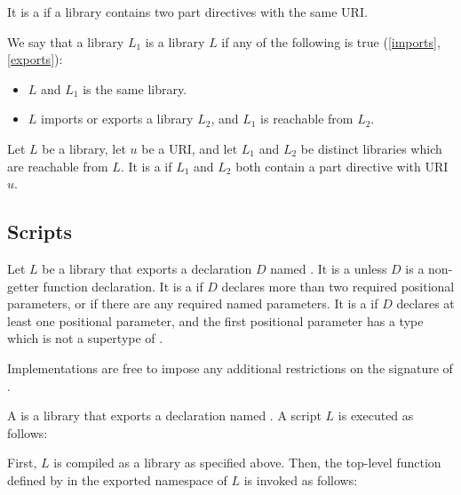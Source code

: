 \documentclass[makeidx]{article}
\begin{document}
\LMHash{}%
It is a  if a library contains
two part directives with the same URI.

\LMHash{}%
We say that a library $L_1$ is  a library $L$ if
any of the following is true (\ref{imports}, \ref{exports}):
\begin{itemize}
\item $L$ and $L_1$ is the same library.
\item $L$ imports or exports a library $L_2$, and $L_1$ is reachable from $L_2$.
\end{itemize}

\LMHash{}%
Let $L$ be a library, let $u$ be a URI,
and let $L_1$ and $L_2$ be distinct libraries which are reachable from $L$.
It is a  if $L_1$ and $L_2$ both contain
a part directive with URI $u$.



\subsection{Scripts}

\LMHash{}%
Let $L$ be a library that exports a declaration $D$ named .
It is a  unless $D$ is
a non-getter function declaration.
It is a  if $D$ declares
more than two required positional parameters,
or if there are any required named parameters.
It is a  if $D$ declares
at least one positional parameter,
and the first positional parameter has a type which is
not a supertype of .

\LMHash{}%
Implementations are free to impose any additional restrictions on
the signature of .

\LMHash{}%
A  is a library that exports a declaration named .
A script $L$ is executed as follows:

\LMHash{}%
First, $L$ is compiled as a library as specified above.
Then, the top-level function defined by 
in the exported namespace of $L$ is invoked as follows:
\end{document}
